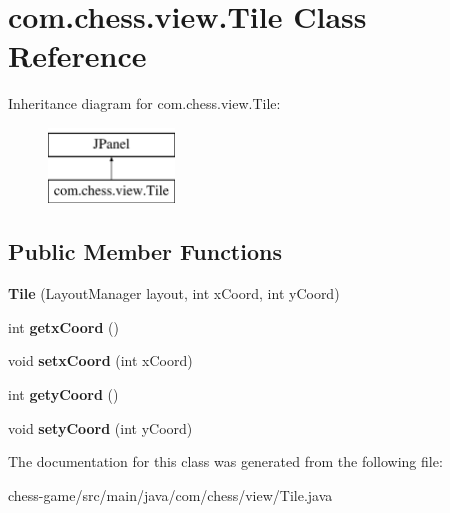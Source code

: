 \hypertarget{classcom_1_1chess_1_1view_1_1_tile}{}\section{com.\+chess.\+view.\+Tile Class Reference}
\label{classcom_1_1chess_1_1view_1_1_tile}
Inheritance diagram for com.\+chess.\+view.\+Tile\+:\begin{figure}[H]
\begin{center}
\leavevmode
\includegraphics[height=2.000000cm]{classcom_1_1chess_1_1view_1_1_tile}
\end{center}
\end{figure}
\subsection*{Public Member Functions}
\begin{DoxyCompactItemize}
\item 
\mbox{\label{classcom_1_1chess_1_1view_1_1_tile_aee24ef1664432e431de0e84a659ad995}} 
{\bfseries Tile} (Layout\+Manager layout, int x\+Coord, int y\+Coord)
\item 
\mbox{\label{classcom_1_1chess_1_1view_1_1_tile_a7c045287f18eaf4cc62b8bd69cf77e11}} 
int {\bfseries getx\+Coord} ()
\item 
\mbox{\label{classcom_1_1chess_1_1view_1_1_tile_abff037b0bac2b8f855375218d248722d}} 
void {\bfseries setx\+Coord} (int x\+Coord)
\item 
\mbox{\label{classcom_1_1chess_1_1view_1_1_tile_a41706b60a990b87029a96b4874fafb00}} 
int {\bfseries gety\+Coord} ()
\item 
\mbox{\label{classcom_1_1chess_1_1view_1_1_tile_ad69c5e782c6af719dbaa6c84ea592c2c}} 
void {\bfseries sety\+Coord} (int y\+Coord)
\end{DoxyCompactItemize}


The documentation for this class was generated from the following file\+:\begin{DoxyCompactItemize}
\item 
chess-\/game/src/main/java/com/chess/view/Tile.\+java\end{DoxyCompactItemize}
